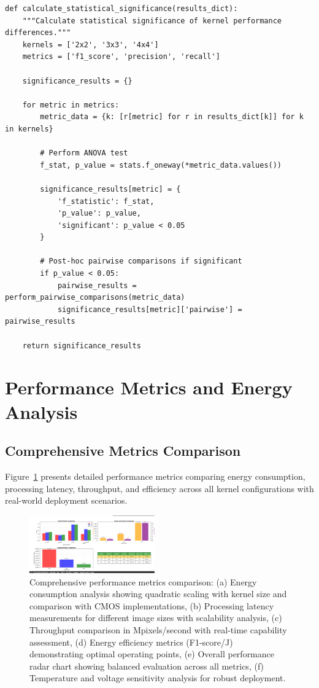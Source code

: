 \documentclass[conference]{IEEEtran}
\begin{document}
\begin{lstlisting}[caption={Performance optimization implementation}]
def calculate_statistical_significance(results_dict):
    """Calculate statistical significance of kernel performance differences."""
    kernels = ['2x2', '3x3', '4x4']
    metrics = ['f1_score', 'precision', 'recall']
    
    significance_results = {}
    
    for metric in metrics:
        metric_data = {k: [r[metric] for r in results_dict[k]] for k in kernels}
        
        # Perform ANOVA test
        f_stat, p_value = stats.f_oneway(*metric_data.values())
        
        significance_results[metric] = {
            'f_statistic': f_stat,
            'p_value': p_value,
            'significant': p_value < 0.05
        }
        
        # Post-hoc pairwise comparisons if significant
        if p_value < 0.05:
            pairwise_results = perform_pairwise_comparisons(metric_data)
            significance_results[metric]['pairwise'] = pairwise_results
    
    return significance_results
\end{lstlisting}

\section{Performance Metrics and Energy Analysis}

\subsection{Comprehensive Metrics Comparison}

Figure~\ref{fig:metrics_comparison} presents detailed performance metrics comparing energy consumption, processing latency, throughput, and efficiency across all kernel configurations with real-world deployment scenarios.

\begin{figure}[htbp]
\centerline{\includegraphics[width=0.48\textwidth]{Screenshot 2025-07-12 123917.png}}
\caption{Comprehensive performance metrics comparison: (a) Energy consumption analysis showing quadratic scaling with kernel size and comparison with CMOS implementations, (b) Processing latency measurements for different image sizes with scalability analysis, (c) Throughput comparison in Mpixels/second with real-time capability assessment, (d) Energy efficiency metrics (F1-score/\textmu J) demonstrating optimal operating points, (e) Overall performance radar chart showing balanced evaluation across all metrics, (f) Temperature and voltage sensitivity analysis for robust deployment.}
\label{fig:metrics_comparison}
\end{figure}
\end{document}
